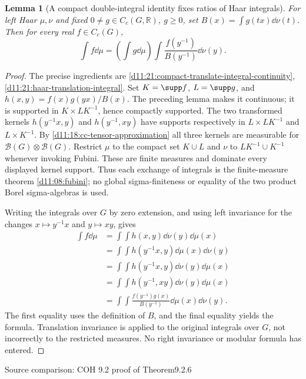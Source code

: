 \documentclass[11pt,oneside,openany]{book}
\newtheorem{lemma}[theorem]{Lemma}
\theoremstyle{definition}
\theoremstyle{remark}
\newcommand{\R}{\mathbb R}\newcommand{\C}{\mathbb C}
\newcommand{\BB}{\mathcal B}\newcommand{\SSS}{\mathcal S}
\newcommand{\family}[1]{}
\newcommand{\source}[1]{\par\begingroup\small\sffamily\color{black!65}Source comparison: #1\par\endgroup}
\begin{document}
\begin{lemma}[A compact double-integral identity fixes ratios of Haar integrals]\family{D11.21.compact_kernel_ratio_identity}\label{d11:21:compact-kernel-ratio-identity}
For left Haar $\mu,\nu$ and fixed $0\ne g\in C_c(G,\R)$, $g\ge0$, set $B(x)=\int g(tx)\dd\nu(t)$. Then for every real $f\in C_c(G)$,
\[\int f\dd\mu=\left(\int g\dd\mu\right)\int\frac{f(y^{-1})}{B(y^{-1})}\dd\nu(y).
\]
\end{lemma}
\begin{proof}
The precise ingredients are \cref{d11:21:compact-translate-integral-continuity}, \cref{d11:21:haar-translation-integral}. Set $K=\supp f$, $L=\supp g$, and $h(x,y)=f(x)g(yx)/B(x)$. The preceding lemma makes it continuous; it is supported in $K\times LK^{-1}$, hence compactly supported. The two transformed kernels $h(y^{-1}x,y)$ and $h(y^{-1},xy)$ have supports respectively in $L\times LK^{-1}$ and $L\times K^{-1}$. By \cref{d11:18:cc-tensor-approximation} all three kernels are measurable for $\BB(G)\otimes\BB(G)$. Restrict $\mu$ to the compact set $K\cup L$ and $\nu$ to $LK^{-1}\cup K^{-1}$ whenever invoking Fubini. These are finite measures and dominate every displayed kernel support. Thus each exchange of integrals is the finite-measure theorem \cref{d11:08:fubini}; no global sigma-finiteness or equality of the two product Borel sigma-algebras is used.

Writing the integrals over $G$ by zero extension, and using left invariance for the changes $x\mapsto y^{-1}x$ and $y\mapsto xy$, gives
\begin{align*}
\int f\dd\mu
 &=\int\!\int h(x,y)\dd\nu(y)\dd\mu(x)\\
 &=\int\!\int h(y^{-1}x,y)\dd\mu(x)\dd\nu(y)\\
 &=\int\!\int h(y^{-1}x,y)\dd\nu(y)\dd\mu(x)\\
 &=\int\!\int h(y^{-1},xy)\dd\nu(y)\dd\mu(x)\\
 &=\int\!\int \frac{f(y^{-1})g(x)}{B(y^{-1})}\dd\mu(x)\dd\nu(y).
\end{align*}
The first equality uses the definition of $B$, and the final equality yields the formula. Translation invariance is applied to the original integrals over $G$, not incorrectly to the restricted measures. No right invariance or modular formula has entered.
\end{proof}
\source{COH 9.2 proof of Theorem9.2.6}
\end{document}
